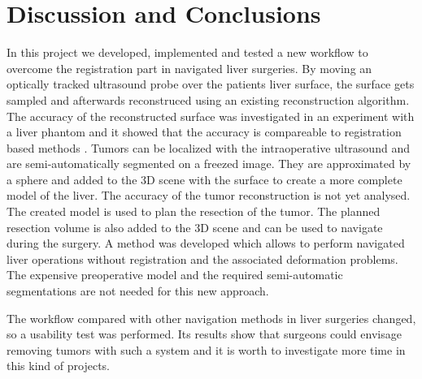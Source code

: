 %
%
%

\chapter{Discussion and Conclusions}
In this project we developed, implemented and tested a new workflow to overcome the registration part in navigated
liver surgeries. By
moving an optically tracked ultrasound probe over the patients liver surface,
the surface gets sampled and afterwards reconstruced using an existing
reconstruction algorithm. The accuracy of the reconstructed surface was investigated in an
experiment with a liver phantom and it showed that the accuracy is compareable to registration based
methods \cite{nam2011automatic}. Tumors can be localized with the
intraoperative ultrasound and are semi-automatically segmented on
a freezed image. They are approximated by a sphere and added to the 3D scene with
the surface 
to create a more complete model of the liver. The accuracy of the tumor
reconstruction is not yet analysed. The created model is used
to plan the resection of the tumor. The planned resection volume is also added to the 3D scene
and can be used to navigate during the surgery. A method was developed
which allows to perform navigated liver operations without registration and the
associated deformation problems. The expensive preoperative model
and the required semi-automatic segmentations are not needed for this new approach.

The workflow compared with other navigation methods in liver surgeries
changed, so a usability test was performed. Its results show that surgeons could
envisage removing tumors with such a system and it is worth to investigate
more time in this kind of projects. 

